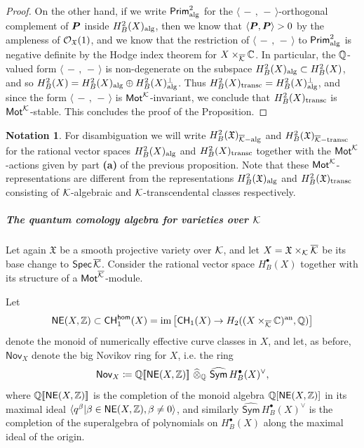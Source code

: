 \documentclass[twoside,leqno]{article}
\numberwithin{equation}{section}
\theoremstyle{plain}
\theoremstyle{definition}
\newtheorem{notation}[equation]{Notation}
\begin{document}
\begin{proof}
On the other hand, if we
write $\mathsf{Prim}^{2}_{\operatorname{alg}}$ for the $\langle\,-\,,\,
-\,\rangle$-orthogonal complement of $\boldsymbol{P}$ inside
$H^{2}_{B}(X)_{\operatorname{alg}}$, then we know that $\langle \boldsymbol{P}, \boldsymbol{P} \rangle > 0$ by
the ampleness of $\mathcal O_{\mathfrak{X}}(1)$, and we know that the restriction of
$\langle\,-\,,\, -\,\rangle$ to $\mathsf{Prim}^{2}_{\operatorname{alg}}$ is
negative definite by the Hodge index theorem for $X\times_{\overline{\mathcal K}}\mathbb C$.
In particular, the $\mathbb Q$-valued form $\langle\,-\,,\, -\,\rangle$  is non-degenerate on the subspace $H^{2}_{B}(X)_{\operatorname{alg}} \subset H^{2}_{B}(X)$, and so 
$H^{2}_{B}(X) = H^{2}_{B}(X)_{\operatorname{alg}}\oplus H^{2}_{B}(X)_{\operatorname{alg}}^{\perp}$. Thus $H^{2}_{B}(X)_{\operatorname{transc}} = H^{2}_{B}(X)_{\operatorname{alg}}^{\perp}$, and since the form  $\langle \, - \, ,\,  - \, \rangle$ is $\mathsf{Mot}^{\mathcal K}$-invariant, we conclude that $H^{2}_{B}(X)_{\operatorname{transc}}$ is $\mathsf{Mot}^{\mathcal K}$-stable. This concludes the proof of the Proposition. 
\end{proof}

\medskip

\begin{notation}
    For disambiguation we will write $H^{2}_{B}(\mathfrak{X})_{\overline{\mathcal K}-\operatorname{alg}}$ and
$H^{2}_{B}(\mathfrak{X})_{\overline{\mathcal K}-\operatorname{transc}}$ for  the rational vector spaces
$H^{2}_{B}(X)_{\operatorname{alg}}$ and $H^{2}_{B}(X)_{\operatorname{transc}}$ together 
    with the $\mathsf{Mot}^{\mathcal K}$-actions given by part {\bfseries (a)} of
    the previous proposition. Note that these
$\mathsf{Mot}^{\mathcal K}$-representations are different from the representations
$H^{2}_{B}(\mathfrak{X})_{\operatorname{alg}}$ and
$H^{2}_{B}(\mathfrak{X})_{\operatorname{transc}}$ consisting of $\mathcal K$-algebraic
and $\mathcal K$-transcendental classes respectively.
\end{notation}

\subparagraph{The quantum comology algebra for varieties over $\mathcal K$} \label{subpar:qcoh}

Let again $\mathfrak{X}$ be a smooth projective variety over $\mathcal K$,
and let $X = \mathfrak{X}\times_{\mathcal K} \overline{\mathcal K}$ be its base change to
$\mathsf{Spec} \, \overline{\mathcal K}$. Consider the rational vector space
$H^{\bullet}_{B}(X)$ together with its structure of a
$\mathsf{Mot}^{\overline{\mathcal K}}$-module.


Let
\[
\mathsf{NE}(X,\mathbb Z) \subset \mathsf{CH}^{\mathsf{hom}}_{1}(X)  =
\operatorname{im}\left[ \mathsf{CH}_{1}(X) \to
  H_{2}((X\times_{\overline{\mathcal K}} \mathbb C)^{\operatorname{an}},\mathbb Q) \right]
\]
denote the monoid of numerically effective curve classes in $X$, and 
let, as before,  $\mathsf{Nov}_{X}$ denote the big
Novikov ring for $X$, i.e. the ring
\[
\mathsf{Nov}_{X} \coloneqq \mathbb Q[\![\mathsf{NE}(X,\mathbb Z)]\!]\ \widehat{\otimes}_{\mathbb Q} \
\widehat{\mathsf{Sym}}\, H^{\bullet}_{B}(X)^{\vee},
\]
where $\mathbb Q[\![\mathsf{NE}(X,\mathbb Z)]\!]$ is the completion of the monoid
algebra $\mathbb Q[\mathsf{NE}(X,\mathbb Z)]$ in its maximal ideal $\langle
q^{\beta} | \beta \in \mathsf{NE}(X,\mathbb Z), \beta \neq 0 \rangle$, and
similarly $\widehat{\mathsf{Sym}}\, H^{\bullet}_{B}(X)^{\vee}$ is the
completion of the superalgebra of polynomials on $H^{\bullet}_{B}(X)$
along the maximal ideal of the origin.
\end{document}
